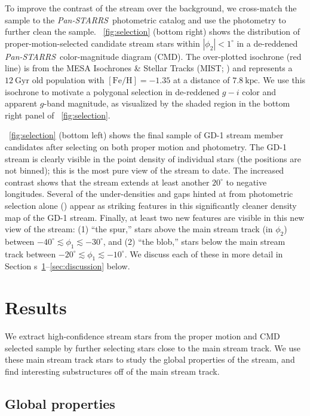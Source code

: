 \documentclass[modern]{aastex62}
\newcommand{\pans}{\textsl{Pan-STARRS}}
\newcommand{\kpc}{\textrm{kpc}}
\newcommand{\feh}{\ensuremath{[\textrm{Fe} / \textrm{H}]}}
\newcommand{\sectionname}{Section}
\begin{document}
To improve the contrast of the stream over the background, we cross-match the
sample to the \pans\ photometric catalog and use the photometry to further clean
the sample.
\figurename~\ref{fig:selection} (bottom right) shows the distribution of
proper-motion-selected candidate stream stars within $\left|\phi_2\right| <
1^\circ$ in a de-reddened \pans\ color-magnitude diagram (CMD).
The over-plotted isochrone (red line) is from the MESA Isochrones \& Stellar
Tracks (MIST; \citealt{Dotter:2016, Choi:2016, Paxton:2011}) and represents a
$12~\textrm{Gyr}$ old population with $\feh = -1.35$ at a distance of
$7.8~\kpc$.
We use this isochrone to motivate a polygonal selection in de-reddened $g-i$
color and apparent $g$-band magnitude, as visualized by the shaded region in the
bottom right panel of \figurename~\ref{fig:selection}.

\figurename~\ref{fig:selection} (bottom left) shows the final sample of GD-1
stream member candidates after selecting on both proper motion and photometry.
The GD-1 stream is clearly visible in the point density of individual stars (the
positions are not binned); this is the most pure view of the stream to date.
The increased contrast shows that the stream extends at least another $20^\circ$
to negative longitudes.
Several of the under-densities and gaps hinted at from photometric selection
alone (\citealt{Koposov:2010, Carlberg:2013}) appear as striking features in
this significantly cleaner density map of the GD-1 stream.
Finally, at least two new features are visible in this new view of the stream:
(1) ``the spur,'' stars above the main stream track (in $\phi_2$) between
$-40^\circ \lesssim \phi_1 \lesssim -30^\circ$, and (2) ``the blob,'' stars
below the main stream track between $-20^\circ \lesssim \phi_1 \lesssim
-10^\circ$.
We discuss each of these in more detail in \sectionname
s~\ref{sec:results}--\ref{sec:discussion} below.


\section{Results}
\label{sec:results}

We extract high-confidence stream stars from the proper motion and CMD selected
sample by further selecting stars close to the main stream track.
We use these main stream track stars to study the global properties of the
stream, and find interesting substructures off of the main stream track.

\subsection{Global properties}
\label{sec:res_global}
\end{document}
